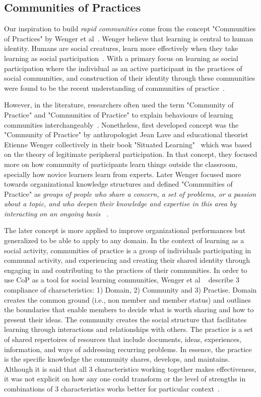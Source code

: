 \documentclass[manuscript,screen,review]{acmart}
\begin{document}
\subsection{Communities of Practices}
Our inspiration to build \textit{rapid communities} come from the concept "Communities of Practices" by Wenger et al~\cite{wenger2010communities}. Wenger believe that learning is central to human identity. Humans are social creatures, learn more effectively when they take learning as social participation~\cite{gauvain2007socialization}. With a primary focus on learning as social participation where the individual as an active participant in the practices of social communities, and construction of their identity through these communities were found to be the recent understanding of communities of practice~\cite{wenger2002cultivating}. 

However, in the literature, researchers often used the term "Community of Practice" and "Communities of Practice" to explain behaviours of learning communities interchangeably~\cite{rogers2000communities}. Nonetheless, first developed concept was the "Community of Practice" by anthropologist Jean Lave and educational theorist Etienne Wenger collectively in their book "Situated Learning"~\cite{lave1991situated} which was based on the theory of legitimate peripheral participation. In that concept, they focused more on how community of participants learn things outside the classroom, specially how novice learners learn from experts. Later Wenger focused more towards organizational knowledge structures and defined "Communities of Practice" as \textit{groups of people who share a concern, a set of problems, or a passion about a topic, and who deepen their knowledge and expertise in this area by interacting on an ongoing basis ~}\cite{wenger2002cultivating}. 

The later concept is more applied to improve organizational performances but generalized to be able to apply to any domain. In the context of learning as a social activity, communities of practice is a group of individuals participating in communal activity, and experiencing and creating their shared identity through engaging in and contributing to the practices of their communities. In order to use CoP as a tool for social learning communities, Wenger  et al ~\cite{wenger2010communities} describe 3 compliance of characteristics: 1) Domain, 2) Community and 3) Practise. Domain creates the common ground (i.e., non member and member status) and outlines the boundaries that enable members to decide what is worth sharing and how to present their ideas. The community creates the social structure that facilitates learning through interactions and relationships with others. The practice is a set of shared repertoires of resources that include documents, ideas, experiences, information, and ways of addressing recurring problems. In essence, the practice is the specific knowledge the community shares, develops, and maintains. Although it is said that all 3 characteristics working together makes effectiveness, it was not explicit on how any one could transform or the level of strengths in combinations of 3 characteristics works better for particular context~\cite{li2009evolution}. 
\end{document}
